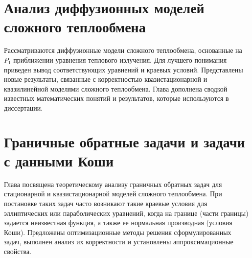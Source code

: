 \documentclass[a4paper,14pt,oneside,openany]{memoir}
\begin{document}
\gappto\captionsrussian{} %




    \chapter{Анализ диффузионных моделей сложного теплообмена}\label{ch:ch1}
    Рассматриваются диффузионные модели сложного теплообмена, основанные
    на $P_1$ приближении уравнения теплового излучения.
    Для лучшего понимания приведен вывод соответствующих уравнений и краевых условий.
    Представлены новые результаты, связанные с корректностью квазистационарной
    и квазилинейной моделями сложного теплообмена.
    Глава дополнена сводкой известных математических понятий и результатов,
    которые используются в диссертации.
    
    
    
    
    
    


    \chapter{Граничные обратные задачи и задачи с данными Коши}\label{ch:ch2}
    Глава посвящена теоретическому анализу граничных обратных задач для
    стационарной и квазистационарной моделей сложного теплообмена.
    При постановке таких задач часто возникают такие краевые условия для
    эллиптических или параболических уравнений, когда на границе (части
    границы) задается неизвестная функция, а также ее нормальная производная
    (условия Коши).
    Предложены оптимизационные методы решения
    сформулированных задач, выполнен анализ их корректности и установлены
    аппроксимационные свойства.
    
    
    
    
\end{document}
